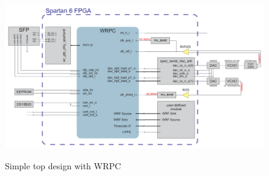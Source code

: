 
\begin{figure}[hbp]
  \begin{center}
    \includegraphics[width=.9\textheight, angle=270]{fig/basic_top.pdf}
    \label{intro:fig:wrpc_top}
    \caption{Simple top design with WRPC}
  \end{center}
\end{figure}


